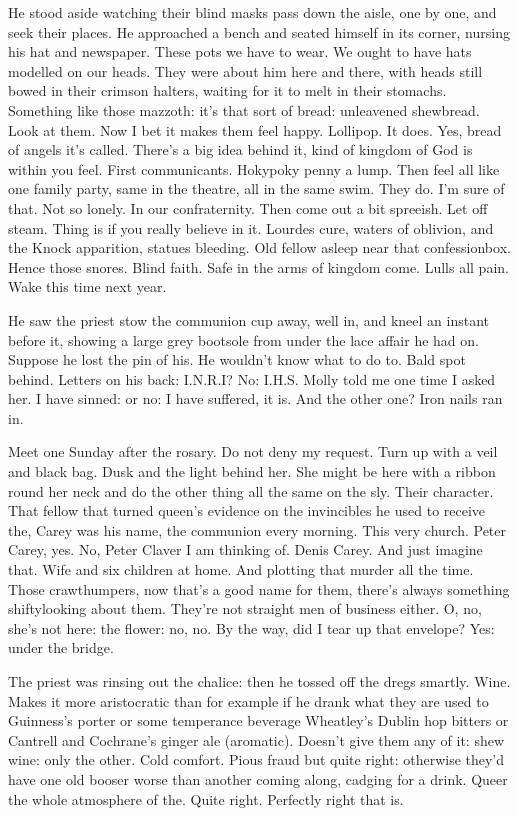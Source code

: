 He stood aside watching their blind masks pass down the aisle, one by
one, and seek their places. He approached a bench and seated himself in
its corner, nursing his hat and newspaper. These pots we have to wear. We
ought to have hats modelled on our heads. They were about him here and
there, with heads still bowed in their crimson halters, waiting for it to
melt in their stomachs. Something like those mazzoth: it's that sort of
bread: unleavened shewbread. Look at them. Now I bet it makes them feel
happy. Lollipop. It does. Yes, bread of angels it's called. There's a big
idea behind it, kind of kingdom of God is within you feel. First
communicants. Hokypoky penny a lump. Then feel all like one family party,
same in the theatre, all in the same swim. They do. I'm sure of that. Not
so lonely. In our confraternity. Then come out a bit spreeish. Let off
steam. Thing is if you really believe in it. Lourdes cure, waters of
oblivion, and the Knock apparition, statues bleeding. Old fellow asleep
near that confessionbox. Hence those snores. Blind faith. Safe in the arms
of kingdom come. Lulls all pain. Wake this time next year.

He saw the priest stow the communion cup away, well in, and kneel
an instant before it, showing a large grey bootsole from under the lace
affair he had on. Suppose he lost the pin of his. He wouldn't know what to
do to. Bald spot behind. Letters on his back: I.N.R.I? No: I.H.S.
Molly told me one time I asked her. I have sinned: or no: I have suffered,
it is. And the other one? Iron nails ran in.

Meet one Sunday after the rosary. Do not deny my request. Turn up
with a veil and black bag. Dusk and the light behind her. She might be
here with a ribbon round her neck and do the other thing all the same on
the sly. Their character. That fellow that turned queen's evidence on the
invincibles he used to receive the, Carey was his name, the communion
every morning. This very church. Peter Carey, yes. No, Peter Claver I am
thinking of. Denis Carey. And just imagine that. Wife and six children
at home. And plotting that murder all the time. Those crawthumpers,
now that's a good name for them, there's always something shiftylooking
about them. They're not straight men of business either. O, no, she's
not here: the flower: no, no. By the way, did I tear up that envelope?
Yes: under the bridge.

The priest was rinsing out the chalice: then he tossed off the dregs
smartly. Wine. Makes it more aristocratic than for example if he drank
what they are used to Guinness's porter or some temperance beverage
Wheatley's Dublin hop bitters or Cantrell and Cochrane's ginger ale
(aromatic). Doesn't give them any of it: shew wine: only the other. Cold
comfort. Pious fraud but quite right: otherwise they'd have one old booser
worse than another coming along, cadging for a drink. Queer the whole
atmosphere of the. Quite right. Perfectly right that is.

